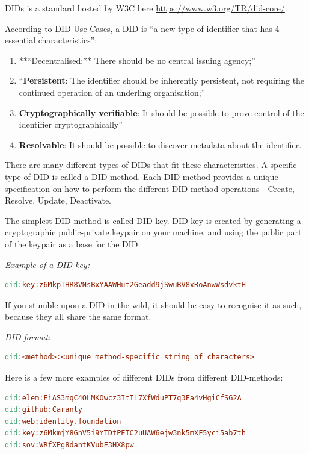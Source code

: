 DIDs is a standard hosted by W3C here
\url{https://www.w3.org/TR/did-core/}.

According to DID Use Cases, a DID is ``a new type of identifier that has
4 essential characteristics'':

\begin{enumerate}
\def\labelenumi{\arabic{enumi}.}
\tightlist
\item
  **``Decentralised:** There should be no central issuing agency;''
\item
  ``\textbf{Persistent}: The identifier should be inherently persistent,
  not requiring the continued operation of an underling organisation;''
\item
  \textbf{Cryptographically verifiable}: It should be possible to prove
  control of the identifier cryptographically''
\item
  \textbf{Resolvable}: It should be possible to discover metadata about
  the identifier.
\end{enumerate}

There are many different types of DIDs that fit these characteristics. A
specific type of DID is called a DID-method. Each DID-method provides a
unique specification on how to perform the different
DID-method-operations - Create, Resolve, Update, Deactivate.

The simplest DID-method is called DID-key. DID-key is created by
generating a cryptographic public-private keypair on your machine, and
using the public part of the keypair as a base for the DID.

\emph{Example of a DID-key:}

\begin{lstlisting}[language=make]
did:key:z6MkpTHR8VNsBxYAAWHut2Geadd9jSwuBV8xRoAnwWsdvktH
\end{lstlisting}

If you stumble upon a DID in the wild, it should be easy to recognise it
as such, because they all share the same format.

\emph{DID format}:

\begin{lstlisting}[language=make]
did:<method>:<unique method-specific string of characters>
\end{lstlisting}

Here is a few more examples of different DIDs from different
DID-methods:

\begin{lstlisting}[language=make]
did:elem:EiAS3mqC4OLMKOwcz3ItIL7XfWduPT7q3Fa4vHgiCfSG2A
did:github:Caranty
did:web:identity.foundation
did:key:z6MkmjY8GnV5i9YTDtPETC2uUAW6ejw3nk5mXF5yci5ab7th
did:sov:WRfXPg8dantKVubE3HX8pw
\end{lstlisting}

